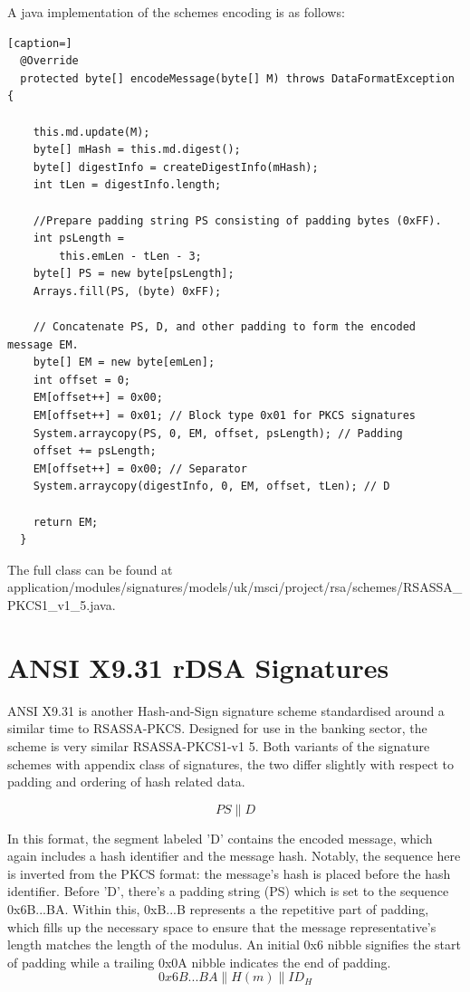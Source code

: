 \documentclass[]{final_report}
\theoremstyle{definition}
\begin{document}
A java implementation of the schemes encoding is as follows: 
\begin{lstlisting}[caption=]
  @Override
  protected byte[] encodeMessage(byte[] M) throws DataFormatException {

    this.md.update(M);
    byte[] mHash = this.md.digest();
    byte[] digestInfo = createDigestInfo(mHash);
    int tLen = digestInfo.length;
    
    //Prepare padding string PS consisting of padding bytes (0xFF).
    int psLength =
        this.emLen - tLen - 3;
    byte[] PS = new byte[psLength];
    Arrays.fill(PS, (byte) 0xFF);

    // Concatenate PS, D, and other padding to form the encoded message EM.
    byte[] EM = new byte[emLen];
    int offset = 0;
    EM[offset++] = 0x00; 
    EM[offset++] = 0x01; // Block type 0x01 for PKCS signatures
    System.arraycopy(PS, 0, EM, offset, psLength); // Padding
    offset += psLength;
    EM[offset++] = 0x00; // Separator
    System.arraycopy(digestInfo, 0, EM, offset, tLen); // D

    return EM;
  }
\end{lstlisting}
The full class can be found at application/modules/signatures/models/uk/msci/project/rsa/schemes/RSASSA\_PKCS1\_v1\_5.java.

\section{ANSI X9.31 rDSA Signatures}
ANSI X9.31 \cite{ANSI-1998-X9-31} is another Hash-and-Sign signature scheme standardised around a similar time to RSASSA-PKCS. Designed for use in the banking sector, the scheme is very similar RSASSA-PKCS1-v1 5. Both variants of the signature schemes with appendix class of signatures, the two differ slightly with respect to padding and ordering of hash related data.


\[PS\|D\]

In this format, the segment labeled 'D' contains the encoded message, which again includes a hash identifier and the message hash. Notably, the sequence here is inverted from the PKCS format: the message's hash is placed before the hash identifier. Before 'D', there's a padding string (PS) which is set to the sequence 0x6B...BA. Within this, 0xB...B represents a the repetitive part of padding, which fills up the necessary space to ensure that the message representative's length matches the length of the modulus. An initial 0x6 nibble signifies the start of padding while a trailing 0x0A nibble indicates the end of padding.
\[0x6B . . . BA\|H(m)\|ID_{H}\]
\end{document}
